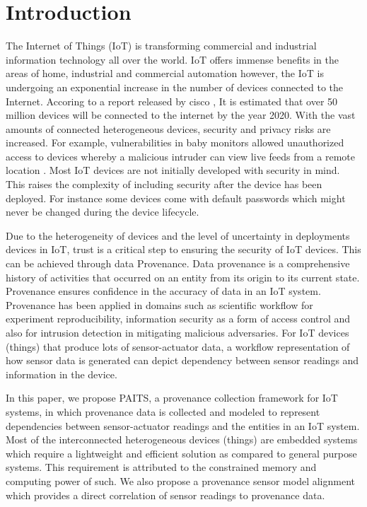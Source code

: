 \documentclass[conference]{IEEEtran}
\begin{document}
\section{Introduction}
The Internet of Things (IoT) is transforming commercial and industrial information technology all over the world. IoT offers immense benefits in the areas of home, industrial and commercial automation however, the IoT is undergoing an exponential increase in the number of devices connected to the Internet. Accoring to a report released by cisco \cite{dave}, It is estimated that over 50 million devices will be connected to the internet by the year 2020. With the vast amounts of connected heterogeneous devices, security and privacy risks are increased. For example, vulnerabilities in baby monitors allowed unauthorized access to devices whereby a malicious intruder can view live feeds from a remote location \cite{rapid7}. Most IoT devices are not initially developed with security in mind. This raises the complexity of including security after the device has been deployed. For instance some devices come with default passwords which might never be changed during the device lifecycle.  

\par Due to the heterogeneity of devices and the level of uncertainty in deployments devices in IoT, trust is a critical step to ensuring the security of IoT devices. This can be achieved through data Provenance. Data provenance is a comprehensive history of activities that occurred on an entity from its origin to its current state. Provenance ensures confidence in the accuracy of data in an IoT system. Provenance has been applied in domains such as scientific workflow for experiment reproducibility, information security as a form of access control and also for intrusion detection in mitigating malicious adversaries. For IoT devices (things) that produce lots of sensor-actuator data, a workflow representation of how sensor data is generated can depict dependency between sensor readings and information in the device. 

\par In this paper, we propose PAITS, a provenance collection framework for IoT systems, in which provenance data is collected and modeled to represent dependencies between sensor-actuator readings and the entities in an IoT system. Most of the interconnected heterogeneous devices (things) are embedded systems which require a lightweight and efficient solution as compared to general purpose
systems. This requirement is attributed to the constrained memory and computing power of such. We also propose a provenance sensor model alignment which provides a direct correlation of sensor readings to provenance data.
\end{document}
